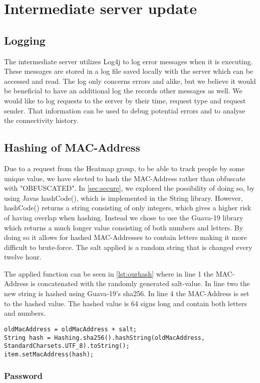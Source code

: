 \section{Intermediate server update}

\subsection*{Logging}
The intermediate server utilizes Log4j\cite{log4j} to log error messages when it is executing. These messages are stored in a log file saved locally with the server which can be accessed and read. The log only concerns errors and alike, but we believe it would be beneficial to have an additional log the records other messages as well. We would like to log requests to the server by their time, request type and request sender. That information can be used to debug potential errors and to analyse the connectivity history. 

\subsection*{Hashing of MAC-Address}
Due to a request from the Heatmap group, to be able to track people by some unique value, we have elected to hash the MAC-Address rather than obfuscate with "OBFUSCATED". In \cref{sec:secure}, we explored the possibility of doing so, by using Javas hashCode(), which is implemented in the String library. However, hashCode() returns a string consisting of only integers, which gives a higher risk of having overlap when hashing. Instead we chose to use the Guava-19 library which returns a much longer value consisting of both numbers and letters. By doing so it allows for hashed MAC-Addresses to contain letters making it more difficult to brute-force. The salt applied is a random string that is changed every twelve hour. 

The applied function can be seen in \cref{lst:ourhash} where in line 1 the MAC-Address is concatenated with the randomly generated salt-value. In line two the new string is hashed using Guava-19's sha256. In line 4 the MAC-Address is set to the hashed value. The hashed value is 64 signs long and contain both letters and numbers.

\begin{lstlisting}[caption={Hashing a MAC-Address},label={lst:ourhash},language=inc_Java]
oldMacAddress = oldMacAddress + salt;
String hash = Hashing.sha256().hashString(oldMacAddress, 
StandardCharsets.UTF_8).toString();
item.setMacAddress(hash);
\end{lstlisting}


\subsubsection*{Password}

